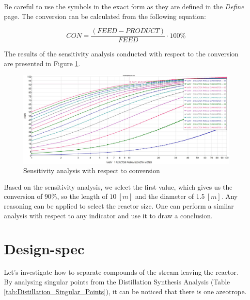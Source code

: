 Be careful to use the symbols in the exact form as they are defined in the \textit{Define} page. The conversion can be calculated from the following equation:

\begin{equation}
	CON = \frac{\left( FEED - PRODUCT \right)}{FEED} \cdot 100 \%
\end{equation}

The results of the sensitivity analysis conducted with respect to the conversion are presented in Figure \ref{fig:Ester_Sensitivity_Analysis_Conversion}.

\begin{figure}[h!]
	\centering
	\includegraphics[width=\textwidth]{Figures/Proces_Analysis/Parametric_sensitivity_analysis_conversion.jpg}
	\caption{Sensitivity analysis with respect to conversion}
	\label{fig:Ester_Sensitivity_Analysis_Conversion}
\end{figure}

Based on the sensitivity analysis, we select the first value, which gives us the conversion of 90\%, so the length of $10~[m]$ and the diameter of $1.5~[m]$. Any reasoning can be applied to select the reactor size. One can perform a similar analysis with respect to any indicator and use it to draw a conclusion.

\section{Design-spec}

Let's investigate how to separate compounds of the stream leaving the reactor. By analysing singular points from the Distillation Synthesis Analysis (Table \ref{tab:Distillation_Singular_Points}), it can be noticed that there is one azeotrope.

